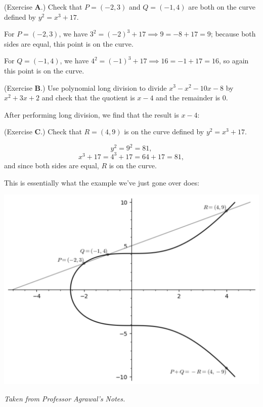 \documentclass[letterpaper]{article}
\begin{document}
\begin{mdframed}
    (Exercise \textbf{A}.) Check that $P = (-2, 3)$ and $Q = (-1, 4)$ are both on the curve defined by $y^2 = x^3 + 17$. 

    \begin{mdframed}
        For $P = (-2, 3)$, we have $3^2 = (-2)^3 + 17 \implies 9 = -8 + 17 = 9$; because both sides are equal, this point is on the curve. 

        \bigskip 

        For $Q = (-1, 4)$, we have $4^2 = (-1)^3 + 17 \implies 16 = -1 + 17 = 16$, so again this point is on the curve.
    \end{mdframed}
\end{mdframed}

\begin{mdframed}
    (Exercise \textbf{B}.) Use polynomial long division to divide $x^3 - x^2 - 10x - 8$ by $x^2 + 3x + 2$ and check that the quotient is $x - 4$ and the remainder is 0.

    \begin{mdframed}
        After performing long division, we find that the result is $x - 4$: 

        \smallskip 

    \end{mdframed}
\end{mdframed}

\begin{mdframed}
    (Exercise \textbf{C}.) Check that $R = (4, 9)$ is on the curve defined by $y^2 = x^3 + 17$. 

    \begin{mdframed}
        \[y^2 = 9^2 = 81,\]
        \[x^3 + 17 = 4^3 + 17 = 64 + 17 = 81,\]
        and since both sides are equal, $R$ is on the curve.
    \end{mdframed}
\end{mdframed}

This is essentially what the example we've just gone over does: 
\begin{center}
    \includegraphics[scale=0.3]{assets/weiers_3.png}

    \emph{Taken from Professor Agrawal's Notes.}
\end{center}
\end{document}
